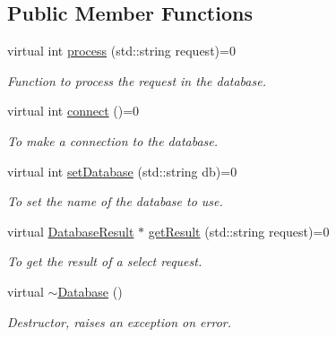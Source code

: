 \subsection*{Public Member Functions}
\begin{DoxyCompactItemize}
\item 
virtual int \hyperlink{classDatabase_a41881436b79aac5f4d8e179056564de1}{process} (std::string request)=0
\begin{DoxyCompactList}\small\item\em Function to process the request in the database. \item\end{DoxyCompactList}\item 
virtual int \hyperlink{classDatabase_aed0ada648871f841cfbe08bc1ee1bf92}{connect} ()=0
\begin{DoxyCompactList}\small\item\em To make a connection to the database. \item\end{DoxyCompactList}\item 
virtual int \hyperlink{classDatabase_aeba15395d2a36faf73dcb995695b9204}{setDatabase} (std::string db)=0
\begin{DoxyCompactList}\small\item\em To set the name of the database to use. \item\end{DoxyCompactList}\item 
virtual \hyperlink{classDatabaseResult}{DatabaseResult} $\ast$ \hyperlink{classDatabase_a30f002bf9752a54c2a056abc1b8bb4d4}{getResult} (std::string request)=0
\begin{DoxyCompactList}\small\item\em To get the result of a select request. \item\end{DoxyCompactList}\item 
\hypertarget{classDatabase_a84d399a2ad58d69daab9b05330e1316d}{
virtual \hyperlink{classDatabase_a84d399a2ad58d69daab9b05330e1316d}{$\sim$Database} ()}
\label{classDatabase_a84d399a2ad58d69daab9b05330e1316d}

\begin{DoxyCompactList}\small\item\em Destructor, raises an exception on error. \item\end{DoxyCompactList}\end{DoxyCompactItemize}

